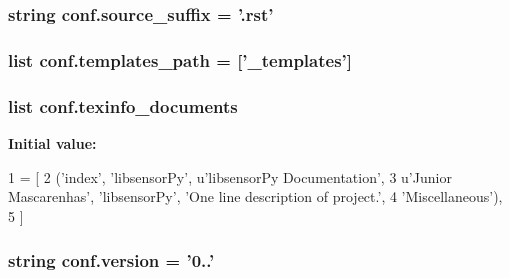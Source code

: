 \subsubsection[{source\+\_\+suffix}]{\setlength{\rightskip}{0pt plus 5cm}string conf.\+source\+\_\+suffix = '.rst'}\label{namespaceconf_a10af2a769eb3bd3322e874f677e435b1}
\hypertarget{namespaceconf_ae850ae634911b713e036b43894fdd525}{}
\subsubsection[{templates\+\_\+path}]{\setlength{\rightskip}{0pt plus 5cm}list conf.\+templates\+\_\+path = \mbox{[}'\+\_\+templates'\mbox{]}}\label{namespaceconf_ae850ae634911b713e036b43894fdd525}
\hypertarget{namespaceconf_a54b0faed214ac92017d5689efbb10672}{}
\subsubsection[{texinfo\+\_\+documents}]{\setlength{\rightskip}{0pt plus 5cm}list conf.\+texinfo\+\_\+documents}\label{namespaceconf_a54b0faed214ac92017d5689efbb10672}
{\bfseries Initial value\+:}
\begin{DoxyCode}
1 = [
2   (\textcolor{stringliteral}{'index'}, \textcolor{stringliteral}{'libsensorPy'}, \textcolor{stringliteral}{u'libsensorPy Documentation'},
3    \textcolor{stringliteral}{u'Junior Mascarenhas'}, \textcolor{stringliteral}{'libsensorPy'}, \textcolor{stringliteral}{'One line description of project.'},
4    \textcolor{stringliteral}{'Miscellaneous'}),
5 ]
\end{DoxyCode}
\hypertarget{namespaceconf_ade15c5b54093b64d7c428ec19ca5b1cb}{}
\subsubsection[{version}]{\setlength{\rightskip}{0pt plus 5cm}string conf.\+version = '0..'}\label{namespaceconf_ade15c5b54093b64d7c428ec19ca5b1cb}
